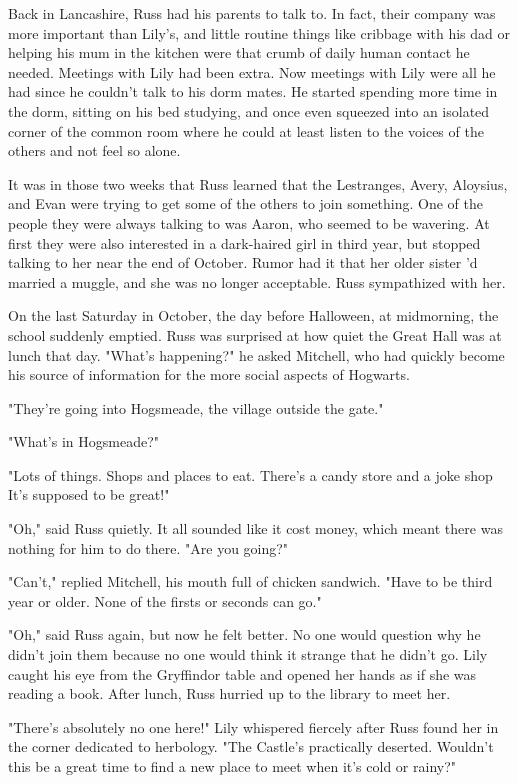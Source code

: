 Back in Lancashire, Russ had his parents to talk to. In fact, their company was more important than Lily's, and little routine things like cribbage with his dad or helping his mum in the kitchen were that crumb of daily human contact he needed. Meetings with Lily had been extra. Now meetings with Lily were all he had since he couldn't talk to his dorm mates. He started spending more time in the dorm, sitting on his bed studying, and once even squeezed into an isolated corner of the common room where he could at least listen to the voices of the others and not feel so alone.

It was in those two weeks that Russ learned that the Lestranges, Avery, Aloysius, and Evan were trying to get some of the others to join something. One of the people they were always talking to was Aaron, who seemed to be wavering. At first they were also interested in a dark-haired girl in third year, but stopped talking to her near the end of October. Rumor had it that her older sister 'd married a muggle, and she was no longer acceptable. Russ sympathized with her.

On the last Saturday in October, the day before Halloween, at midmorning, the school suddenly emptied. Russ was surprised at how quiet the Great Hall was at lunch that day. "What's{\el} happening?" he asked Mitchell, who had quickly become his source of information for the more social aspects of Hogwarts.

"They're going into Hogsmeade, the village outside the gate."

"What's in{\el} Hogsmeade?"

"Lots of things. Shops and places to eat. There's a candy store and a joke shop{\el} It's supposed to be great!"

"Oh," said Russ quietly. It all sounded like it cost money, which meant there was nothing for him to do there. "Are you{\el} going?"

"Can't," replied Mitchell, his mouth full of chicken sandwich. "Have to be third year or older. None of the firsts or seconds can go."

"Oh," said Russ again, but now he felt better. No one would question why he didn't join them because no one would think it strange that he didn't go. Lily caught his eye from the Gryffindor table and opened her hands as if she was reading a book. After lunch, Russ hurried up to the library to meet her.

"There's absolutely no one here!" Lily whispered fiercely after Russ found her in the corner dedicated to herbology. "The Castle's practically deserted. Wouldn't this be a great time to find a new place to meet when it's cold or rainy?"


